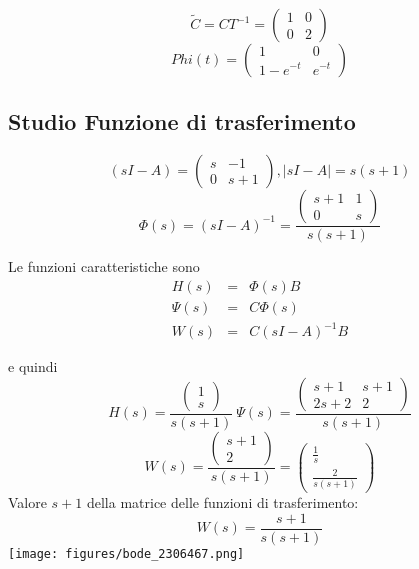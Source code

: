 \documentclass{article}
\begin{document}
\[ \widetilde{C} = C T^{-1} = \left(\begin{matrix}1 & 0\\0 & 2\end{matrix}\right) \]
\[Phi(t) = \left(\begin{matrix}1 & 0\\1 - e^{- t} & e^{- t}\end{matrix}\right) \]

\subsection{Studio Funzione di trasferimento}

\[ (sI-A) = \left(\begin{matrix}s & -1\\0 & s + 1\end{matrix}\right), |sI-A| = s \left(s + 1\right) \]
\[ \Phi(s) = (sI-A)^{-1} = \frac{\left(\begin{matrix}s + 1 & 1\\0 & s\end{matrix}\right)}{s \left(s + 1\right)} \]

Le funzioni caratteristiche sono \[\begin{array}{rcl}  H(s) & = & \Phi(s)B \\ \Psi(s) & = & C \Phi(s)\\ W(s) & = & C(sI-A)^{-1}B  \end{array} \]

e quindi \[ H(s)  =  \frac{\left(\begin{matrix}1\\s\end{matrix}\right)}{s \left(s + 1\right)} \ \Psi(s) = \frac{\left(\begin{matrix}s + 1 & s + 1\\2 s + 2 & 2\end{matrix}\right)}{s \left(s + 1\right)} \]
\[ W(s)  =  \frac{\left(\begin{matrix}s + 1\\2\end{matrix}\right)}{s \left(s + 1\right)} = \left(\begin{matrix}\frac{1}{s}\\\frac{2}{s \left(s + 1\right)}\end{matrix}\right)  \] 
Valore $ s + 1 $ della matrice delle funzioni di trasferimento:
\[ W(s) = \frac{s + 1}{s \left(s + 1\right)} \]\texttt{[image: figures/bode\_2306467.png]}
\end{document}
